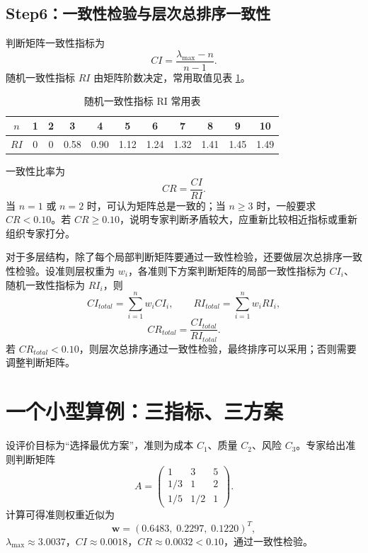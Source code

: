 \documentclass[UTF8,zihao=-4,fontset=none]{ctexart}
\begin{document}
\subsection{Step6：一致性检验与层次总排序一致性}
判断矩阵一致性指标为
\begin{equation}
  CI=\frac{\lambda_{\max}-n}{n-1} .
\end{equation}
随机一致性指标 $RI$ 由矩阵阶数决定，常用取值见表 \ref{tab:ri}。
\begin{table}[H]
\centering
\caption{随机一致性指标 RI 常用表}
\label{tab:ri}
\begin{tabular}{c|cccccccccc}
\toprule
$n$ & 1 & 2 & 3 & 4 & 5 & 6 & 7 & 8 & 9 & 10\\
\midrule
$RI$ & 0 & 0 & 0.58 & 0.90 & 1.12 & 1.24 & 1.32 & 1.41 & 1.45 & 1.49\\
\bottomrule
\end{tabular}
\end{table}
一致性比率为
\begin{equation}
  CR=\frac{CI}{RI} .
\end{equation}
当 $n=1$ 或 $n=2$ 时，可认为矩阵总是一致的；当 $n\ge 3$ 时，一般要求 $CR<0.10$。若 $CR\ge 0.10$，说明专家判断矛盾较大，应重新比较相近指标或重新组织专家打分。

对于多层结构，除了每个局部判断矩阵要通过一致性检验，还要做层次总排序一致性检验。设准则层权重为 $w_i$，各准则下方案判断矩阵的局部一致性指标为 $CI_i$、随机一致性指标为 $RI_i$，则
\begin{equation}
  CI_{total}=\sum_{i=1}^{n}w_iCI_i,
  \qquad
  RI_{total}=\sum_{i=1}^{n}w_iRI_i,
\end{equation}
\begin{equation}
  CR_{total}=\frac{CI_{total}}{RI_{total}} .
\end{equation}
若 $CR_{total}<0.10$，则层次总排序通过一致性检验，最终排序可以采用；否则需要调整判断矩阵。

\section{一个小型算例：三指标、三方案}
设评价目标为“选择最优方案”，准则为成本 $C_1$、质量 $C_2$、风险 $C_3$。专家给出准则判断矩阵
\begin{equation}
A=\begin{pmatrix}
1 & 3 & 5\\
1/3 & 1 & 2\\
1/5 & 1/2 & 1
\end{pmatrix}.
\end{equation}
计算可得准则权重近似为
\begin{equation}
  \bm w=(0.6483,\;0.2297,\;0.1220)^T,
\end{equation}
$\lambda_{\max}\approx 3.0037$，$CI\approx0.0018$，$CR\approx0.0032<0.10$，通过一致性检验。
\end{document}
